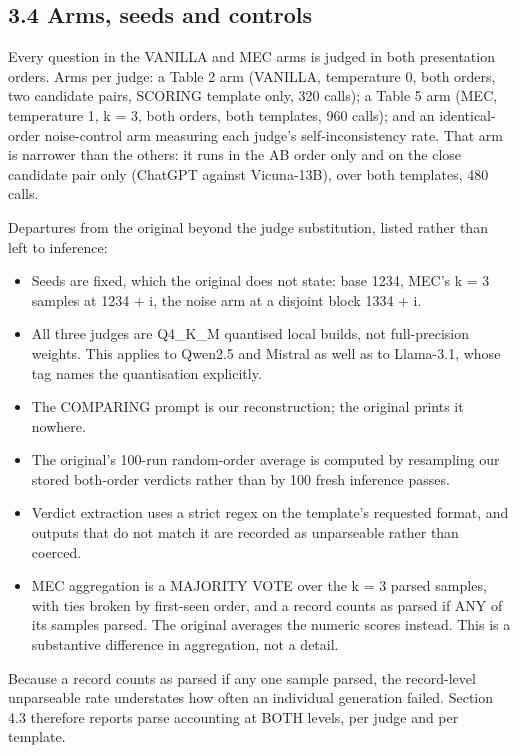 \subsection{3.4 Arms, seeds and controls}\label{arms-seeds-and-controls}

Every question in the VANILLA and MEC arms is judged in both presentation orders. Arms per judge: a
Table 2 arm (VANILLA, temperature 0, both orders, two candidate pairs, SCORING template only, 320
calls); a Table 5 arm (MEC, temperature 1, k = 3, both orders, both templates, 960 calls); and an
identical-order noise-control arm measuring each judge's self-inconsistency rate. That arm is
narrower than the others: it runs in the AB order only and on the close candidate pair only
(ChatGPT against Vicuna-13B), over both templates, 480 calls.

Departures from the original beyond the judge substitution, listed rather than left to inference:

\begin{itemize}
\tightlist
\item
  Seeds are fixed, which the original does not state: base 1234, MEC's k = 3 samples at 1234 + i, the
  noise arm at a disjoint block 1334 + i.
\item
  All three judges are Q4\_K\_M quantised local builds, not full-precision weights. This applies to
  Qwen2.5 and Mistral as well as to Llama-3.1, whose tag names the quantisation explicitly.
\item
  The COMPARING prompt is our reconstruction; the original prints it nowhere.
\item
  The original's 100-run random-order average is computed by resampling our stored both-order
  verdicts rather than by 100 fresh inference passes.
\item
  Verdict extraction uses a strict regex on the template's requested format, and outputs that do not
  match it are recorded as unparseable rather than coerced.
\item
  MEC aggregation is a MAJORITY VOTE over the k = 3 parsed samples, with ties broken by first-seen
  order, and a record counts as parsed if ANY of its samples parsed. The original averages the
  numeric scores instead. This is a substantive difference in aggregation, not a detail.
\end{itemize}

Because a record counts as parsed if any one sample parsed, the record-level unparseable rate
understates how often an individual generation failed. Section 4.3 therefore reports parse
accounting at BOTH levels, per judge and per template.

